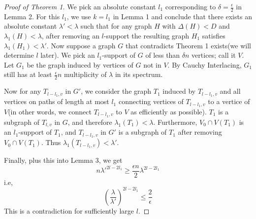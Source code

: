 \documentclass{article}
\theoremstyle{definition} %
\theoremstyle{plain} %
\begin{document}
\begin{proof}[Proof of Theorem 1]
We pick an absolute constant $l_1$ corresponding to $\delta = \frac{\epsilon}{2}$ in Lemma 2. For this $l_1$, we use $k = l_1$ in Lemma 1 and conclude that there exists an absolute constant $\lambda' < \lambda$ such that for any graph $H$ with $\Delta(H) < D$ and $\lambda_1(H) < \lambda$, after removing an $l$-support the resulting graph $H_1$ satisfies $\lambda_1(H_1) < \lambda'$. Now suppose a graph $G$ that contradicts Theorem 1 exists(we will determine $l$ later). We pick an $l_1$-support of $G$ of less than $\delta n$ vertices; call it $V$. Let $G_1$ be the graph induced by vertices of $G$ not in $V$. By Cauchy Interlacing, $G_1$ still has at least $\frac{\epsilon}{2}n$ multiplicity of $\lambda$ in its spectrum.

Now for any $T_{{l - l_1},v}$ in $G'$, we consider the graph $T_1$ induced by $T_{{l - l_1},v}$ and all vertices on paths of length at most $l_1$ connecting vertices of  $T_{{l - l_1},v}$ to a vertice of $V$(in other words, we connect $T_{{l - l_1},v}$ to $V$ as efficiently as possible). $T_1$ is a subgraph of $T_{l,v}$ in $G$, and therefore $\lambda_1(T_1) < \lambda$. Furthermore, $V_0\cap V(T_1)$ is an $l_1$-support of $T_1$, and $T_{{l - l_1},v}$ in $G'$ is a subgraph of $T_1$ after removing $V_0\cap V(T_1)$. Thus $\lambda_1(T_{{l - l_1},v}) < \lambda'$. 

Finally, plus this into Lemma 3, we get
$$n \lambda'^{2l - 2l_1} \geq \frac{\epsilon n}{2}\lambda^{2l - 2l_1}$$
i.e,
$$(\frac{\lambda}{\lambda'})^{2l - 2l_1} \leq \frac{2}{\epsilon}$$
This is a contradiction for sufficiently large $l$.
\end{proof}{}
\end{document}
